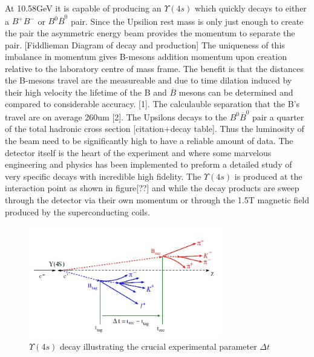At 10.58GeV it is capable of producing an $\Upsilon(4s)$ which quickly decays to either a $B^+B^-$ or $B^0\overline{B}^0$ pair. Since the Upsilion rest mass is only just enough to create the pair the asymmetric energy beam provides the momentum to separate the pair.
[Fiddlieman Diagram of decay and production]
The uniqueness of this imbalance in momentum gives B-mesons addition momentum upon creation relative to the laboratory centre of mass frame. The benefit is that the distances the B-mesons travel are the measureable and due to time dilation induced by their high velocity the lifetime of the B and $\overline{B}$ mesons can be determined and compared to considerable accuracy. [1]. The calculauble separation that the B’s travel are on average 260um [2]. The Upsilons decays to the $B^0 \overline{B}^0$ pair a quarter of  the total hadronic cross section [citation+decay table]. Thus the luminosity of the beam need to be significantly high to have a reliable amount of data.
The detector itself is the heart of the experiment and where some marvelous engineering and physics has been implemented to preform a detailed study of very specific decays with incredible high fidelity. The $\Upsilon(4s)$ is produced at the interaction point as shown in figure[??] and while the decay products are sweep through the detector via their own momentum or through the 1.5T magnetic field produced by the superconducting coils. 

\begin{figure}[h]
\centering
\includegraphics[width=0.75\textwidth]{figs/dt.JPG}
\caption{$\Upsilon (4s)$ decay illustrating the crucial experimental parameter $\Delta t$}
\label{BBD}
\end{figure}


